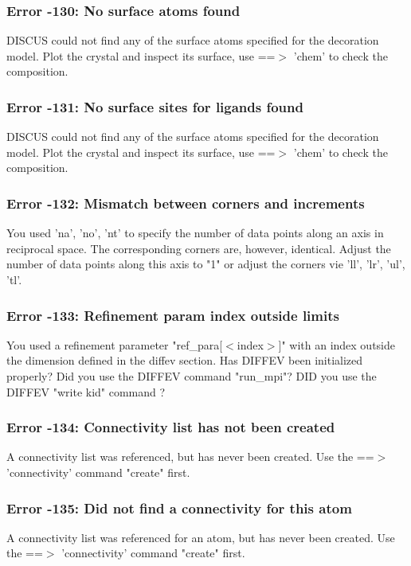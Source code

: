 \subsubsection{Error -130: No surface atoms found}
\par
DISCUS could not find any of the surface atoms specified for the 
decoration model. 
Plot the crystal and inspect its surface, use ==$> $ 'chem' to 
check the composition. 
\subsubsection{Error -131: No surface sites for ligands found}
\par
DISCUS could not find any of the surface atoms specified for the 
decoration model. 
Plot the crystal and inspect its surface, use ==$> $ 'chem' to 
check the composition. 
\subsubsection{Error -132: Mismatch between corners and increments}
\par
You used 'na', 'no', 'nt' to specify the number of data 
points along an axis in reciprocal space. The corresponding 
corners are, however, identical. 
Adjust the number of data points along this axis to "1" 
or adjust the corners vie 'll', 'lr', 'ul', 'tl'. 
\subsubsection{Error -133: Refinement param index outside limits}
\par
You used a refinement parameter "ref\_para[$ <$index$> $]" with an 
index outside the dimension defined in the diffev section. 
Has DIFFEV been initialized properly? 
Did you use the DIFFEV command "run\_mpi"? 
DID you use the DIFFEV "write kid" command ? 
\subsubsection{Error -134: Connectivity list has not been created}
\par
A connectivity list was referenced, but has never been 
created. Use the ==$> $ 'connectivity' command "create" first. 
\subsubsection{Error -135: Did not find a connectivity for this atom}
\par
A connectivity list was referenced for an atom, but 
has never been created. Use the ==$> $ 'connectivity' 
command "create" first. 
